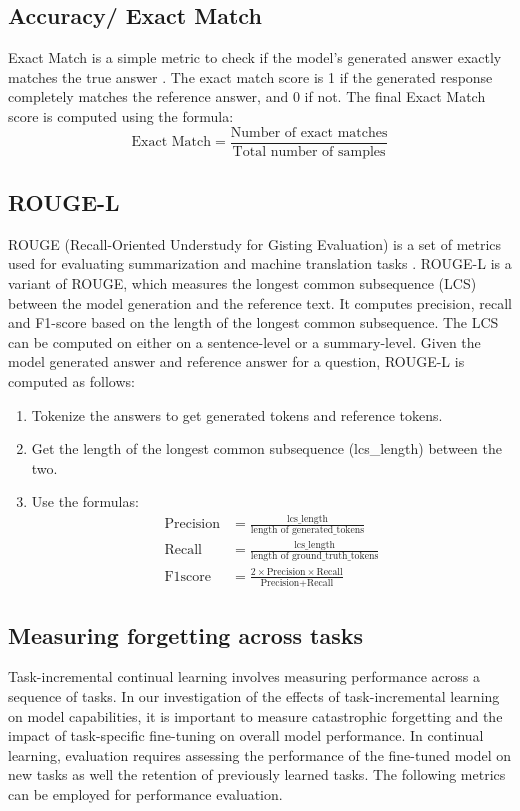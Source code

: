 \subsection{Accuracy/ Exact Match} \label{accuracy}
Exact Match is a simple metric to check if the model’s generated answer exactly matches the true answer \cite{wu2023online}. The exact match score is 1 if the generated response completely matches the reference answer, and 0 if not. The final Exact Match score is computed using the formula:
\begin{equation}
\text{Exact Match} = \frac{\text{Number of exact matches}}{\text{Total number of samples}}
\end{equation}

\subsection{ROUGE-L} \label{rougel}
ROUGE (Recall-Oriented Understudy for Gisting Evaluation) is a set of metrics used for evaluating summarization and machine translation tasks \cite{lin2004rouge}. ROUGE-L is a variant of ROUGE, which measures the longest common subsequence (LCS) between the model generation and the reference text. It computes precision, recall and F1-score based on the length of the longest common subsequence. The LCS can be computed on either on a sentence-level or a summary-level.
Given the model generated answer and reference answer for a question, ROUGE-L is computed as follows:
\begin{enumerate}
\item Tokenize the answers to get generated tokens and reference tokens.
\item Get the length of the longest common subsequence (lcs\_length) between the two.
\item Use the formulas:
\begin{align*}
\text{Precision} &= \frac{\text{lcs\_length}}{\text{length of generated\_tokens}} \\
\text{Recall} &= \frac{\text{lcs\_length}}{\text{length of ground\_truth\_tokens}} \\
\text{F1score} &= \frac{2 \times \text{Precision} \times \text{Recall}}{\text{Precision} + \text{Recall}}
\end{align*}
\end{enumerate}

\subsection{Measuring forgetting across tasks}
Task-incremental continual learning involves measuring performance across a sequence of tasks. In our investigation of the effects of task-incremental learning on model capabilities, it is important to measure catastrophic forgetting and the impact of task-specific fine-tuning on overall model performance. In continual learning, evaluation requires assessing the performance of the fine-tuned model on new tasks as well the retention of previously learned tasks. The following metrics can be employed for performance evaluation.

